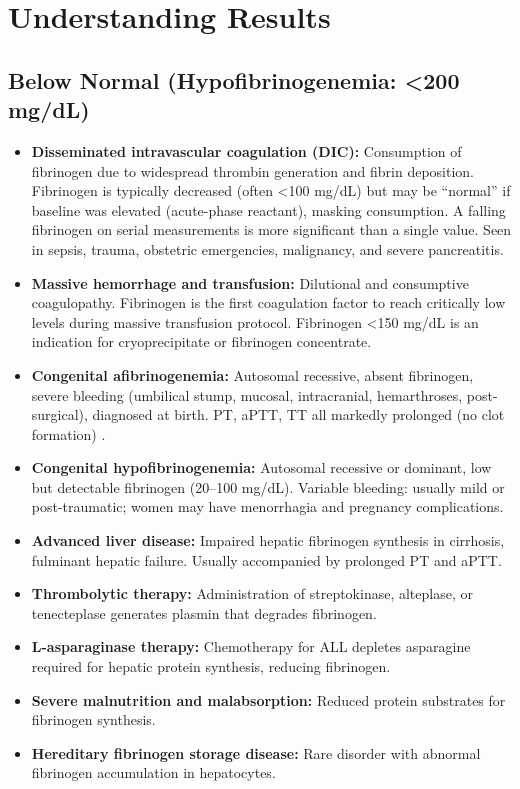 \section*{Understanding Results}

\subsection*{Below Normal (Hypofibrinogenemia: <200 mg/dL)}
\begin{itemize}
  \item \textbf{Disseminated intravascular coagulation (DIC):} Consumption of fibrinogen due to widespread thrombin generation and fibrin deposition. Fibrinogen is typically decreased (often <100 mg/dL) but may be ``normal'' if baseline was elevated (acute-phase reactant), masking consumption. A falling fibrinogen on serial measurements is more significant than a single value. Seen in sepsis, trauma, obstetric emergencies, malignancy, and severe pancreatitis.
  \item \textbf{Massive hemorrhage and transfusion:} Dilutional and consumptive coagulopathy. Fibrinogen is the first coagulation factor to reach critically low levels during massive transfusion protocol. Fibrinogen <150 mg/dL is an indication for cryoprecipitate or fibrinogen concentrate.
  \item \textbf{Congenital afibrinogenemia:} Autosomal recessive, absent fibrinogen, severe bleeding (umbilical stump, mucosal, intracranial, hemarthroses, post-surgical), diagnosed at birth. PT, aPTT, TT all markedly prolonged (no clot formation) \cite{demoerloose2013congenital}.
  \item \textbf{Congenital hypofibrinogenemia:} Autosomal recessive or dominant, low but detectable fibrinogen (20--100 mg/dL). Variable bleeding: usually mild or post-traumatic; women may have menorrhagia and pregnancy complications.
  \item \textbf{Advanced liver disease:} Impaired hepatic fibrinogen synthesis in cirrhosis, fulminant hepatic failure. Usually accompanied by prolonged PT and aPTT.
  \item \textbf{Thrombolytic therapy:} Administration of streptokinase, alteplase, or tenecteplase generates plasmin that degrades fibrinogen.
  \item \textbf{L-asparaginase therapy:} Chemotherapy for ALL depletes asparagine required for hepatic protein synthesis, reducing fibrinogen.
  \item \textbf{Severe malnutrition and malabsorption:} Reduced protein substrates for fibrinogen synthesis.
  \item \textbf{Hereditary fibrinogen storage disease:} Rare disorder with abnormal fibrinogen accumulation in hepatocytes.
\end{itemize}

